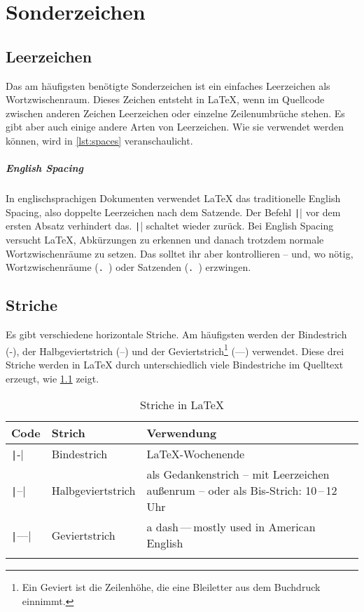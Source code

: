 \chapter{Sonderzeichen}
\label{sec:special-characters}

\section{Leerzeichen}

Das am häufigsten benötigte Sonderzeichen ist ein einfaches Leerzeichen als Wortzwischenraum.
Dieses Zeichen entsteht in \LaTeX, wenn im Quellcode zwischen anderen Zeichen Leerzeichen oder einzelne Zeilenumbrüche stehen.
Es gibt aber auch einige andere Arten von Leerzeichen.
Wie sie verwendet werden können, wird in \cref{lst:spaces} veranschaulicht.


\paragraph{English Spacing}
In englischsprachigen Dokumenten verwendet LaTeX das traditionelle English Spacing, also doppelte Leerzeichen nach dem Satzende.
Der Befehl \texttt|\frenchspacing| vor dem ersten Absatz verhindert das.
\texttt|\nonfrenchspacing| schaltet wieder zurück.
Bei English Spacing versucht \LaTeX, Abkürzungen zu erkennen und danach trotzdem normale Wortzwischenräume zu setzen.
Das solltet ihr aber kontrollieren – und, wo nötig,
Wortzwischenräume (\texttt{.\ }) oder Satzenden (\texttt{\@. }) erzwingen.

\section{Striche}
Es gibt verschiedene horizontale Striche.
Am häufigsten werden der Bindestrich (-), der Halbgeviertstrich (–) und der Geviertstrich\footnote{Ein Geviert ist die Zeilenhöhe, die eine Bleiletter aus dem Buchdruck einnimmt.} (—) verwendet.
Diese drei Striche werden in \LaTeX{} durch unterschiedlich viele Bindestriche im Quelltext erzeugt, wie \cref{tbl:bars} zeigt.

\begin{longtable}{@{}llp{7.8cm}@{}}
	\toprule
	Code       & Strich            & Verwendung \\
	\midrule
	\texttt|-|   & Bindestrich       & \LaTeX-Wochenende \\
	\texttt|--|  & Halbgeviertstrich & als Gedankenstrich – mit Leerzeichen außenrum – oder als Bis-Strich: 10\,–\,12 Uhr \\
	\texttt|---| & Geviertstrich     & a dash\,—\,mostly used in American English \\
	\bottomrule
	\caption{Striche in \LaTeX}
	\label{tbl:bars}
\end{longtable}

